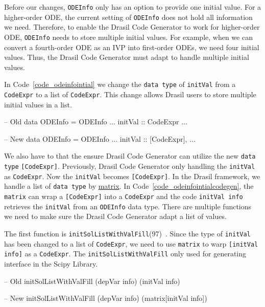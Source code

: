 Before our changes, \verb|ODEInfo| only has an option to provide one initial value. For a higher-order ODE, the current setting of \verb|ODEInfo| does not hold all information we need. Therefore, to enable the Drasil Code Generator to work for higher-order ODE, \verb|ODEInfo| needs to store multiple initial values. For example, when we can convert a fourth-order ODE as an IVP into first-order ODEs, we need four initial values. Thus, the Drasil Code Generator must adapt to handle multiple initial values.

In Code~\ref{code_odeinfointial} we change the \verb|data type| of \verb|initVal| from a \verb|CodeExpr| to a list of \verb|CodeExpr|. This change allows Drasil users to store multiple initial values in a list.
\begin{listing}[ht]
\begin{haskell1}
-- Old 
data ODEInfo = ODEInfo {
  ...
  initVal :: CodeExpr
  ...
}

-- New 
data ODEInfo = ODEInfo {
  ...
  initVal :: [CodeExpr],
  ...
}
\end{haskell1}
\label{code_odeinfointial}
\end{listing}

We also have to that the ensure Drasil Code Generator can utilize the new \verb|data type| \verb|[CodeExpr]|. Previously, Drasil Code Generator only handling the \verb|initVal| as \verb|CodeExpr|. Now the \verb|initVal| becomes \verb|[CodeExpr]|. In the Drasil framework, we handle a list of \verb|data type| by \href{https://jacquescarette.github.io/Drasil/docs/drasil-code-base-0.1.9.0/Language-Drasil-CodeExpr.html#v:matrix}{matrix}. In Code~\ref{code_odeinfointialcodegen}, the \verb|matrix| can wrap a \verb|[CodeExpr]| into a \verb|CodeExpr| and the code \verb|initVal info| retrieves the \verb|initVal| from an \verb|ODEInfo| data type. There are multiple functions we need to make sure the Drasil Code Generator adapt a list of values. 

The first function is \verb|initSolListWithValFill|(97)~\citep{brooks}. Since the type of \verb|initVal| has been changed to a list of \verb|CodeExpr|, we need to use \verb|matrix| to warp \verb|[initVal info]| as a \verb|CodeExpr|. The \verb|initSolListWithValFill| only used for generating interface in the Scipy Library.
\begin{listing}[ht]
\begin{haskell1}
-- Old 
initSolListWithValFill (depVar info) (initVal info)

-- New 
initSolListWithValFill (depVar info) (matrix[initVal info]) 
\end{haskell1}
\end{listing}

